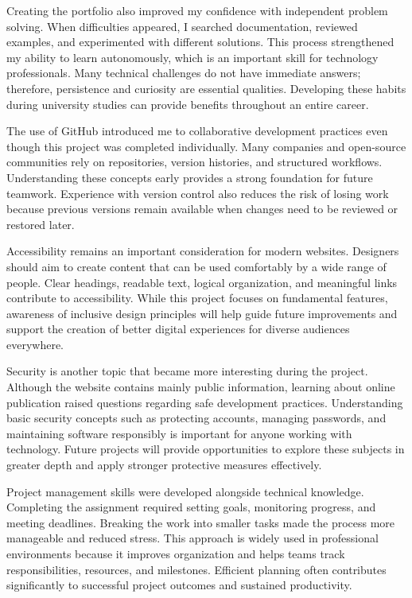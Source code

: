 \documentclass[12pt]{article}
\begin{document}
Creating the portfolio also improved my confidence with independent problem solving. When difficulties appeared, I searched documentation, reviewed examples, and experimented with different solutions. This process strengthened my ability to learn autonomously, which is an important skill for technology professionals. Many technical challenges do not have immediate answers; therefore, persistence and curiosity are essential qualities. Developing these habits during university studies can provide benefits throughout an entire career.

The use of GitHub introduced me to collaborative development practices even though this project was completed individually. Many companies and open-source communities rely on repositories, version histories, and structured workflows. Understanding these concepts early provides a strong foundation for future teamwork. Experience with version control also reduces the risk of losing work because previous versions remain available when changes need to be reviewed or restored later.

Accessibility remains an important consideration for modern websites. Designers should aim to create content that can be used comfortably by a wide range of people. Clear headings, readable text, logical organization, and meaningful links contribute to accessibility. While this project focuses on fundamental features, awareness of inclusive design principles will help guide future improvements and support the creation of better digital experiences for diverse audiences everywhere.

Security is another topic that became more interesting during the project. Although the website contains mainly public information, learning about online publication raised questions regarding safe development practices. Understanding basic security concepts such as protecting accounts, managing passwords, and maintaining software responsibly is important for anyone working with technology. Future projects will provide opportunities to explore these subjects in greater depth and apply stronger protective measures effectively.

Project management skills were developed alongside technical knowledge. Completing the assignment required setting goals, monitoring progress, and meeting deadlines. Breaking the work into smaller tasks made the process more manageable and reduced stress. This approach is widely used in professional environments because it improves organization and helps teams track responsibilities, resources, and milestones. Efficient planning often contributes significantly to successful project outcomes and sustained productivity.
\end{document}
